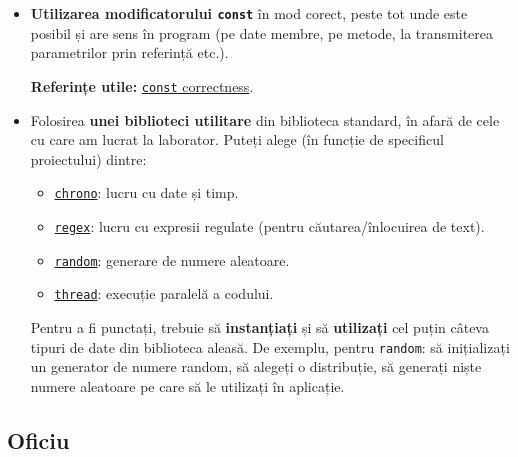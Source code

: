 \begin{itemize}
    \item \textbf{Utilizarea modificatorului \texttt{const}} în mod corect, peste tot unde este posibil și are sens în program (pe date membre, pe metode, la transmiterea parametrilor prin referință etc.).

    \textbf{Referințe utile:} \href{https://isocpp.org/wiki/faq/const-correctness}{\texttt{const} correctness}.

    \item Folosirea \textbf{unei biblioteci utilitare} din biblioteca standard, în afară de cele cu care am lucrat la laborator. Puteți alege (în funcție de specificul proiectului) dintre:
    \begin{itemize}
        \item \href{https://en.cppreference.com/w/cpp/chrono}{\texttt{chrono}}: lucru cu date și timp.
        \item \href{https://en.cppreference.com/w/cpp/regex}{\texttt{regex}}: lucru cu expresii regulate (pentru căutarea/înlocuirea de text).
        \item \href{https://en.cppreference.com/w/cpp/numeric/random}{\texttt{random}}: generare de numere aleatoare.
        \item \href{https://en.cppreference.com/w/cpp/thread}{\texttt{thread}}: execuție paralelă a codului.
    \end{itemize}
    Pentru a fi punctați, trebuie să \textbf{instanțiați} și să \textbf{utilizați} cel puțin câteva tipuri de date din biblioteca aleasă. De exemplu, pentru \texttt{random}: să inițializați un generator de numere random, să alegeți o distribuție, să generați niște numere aleatoare pe care să le utilizați în aplicație.
\end{itemize}

\subsection*{Oficiu}
